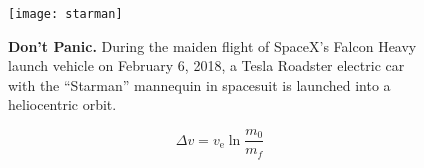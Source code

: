\lipsum[10]

\begin{figure}[ht]
    \texttt{[image: starman]}
    \caption[Don't Panic]{{\bf Don't Panic.} During the maiden flight of SpaceX's Falcon Heavy launch vehicle on February 6, 2018, a Tesla Roadster electric car with the ``Starman'' mannequin in spacesuit is launched into a heliocentric orbit.}
\end{figure}

\lipsum[11]

\begin{equation}
    \Delta v = v_\text{e} \ln \frac{m_0}{m_f}
\end{equation}

\lipsum[12]
